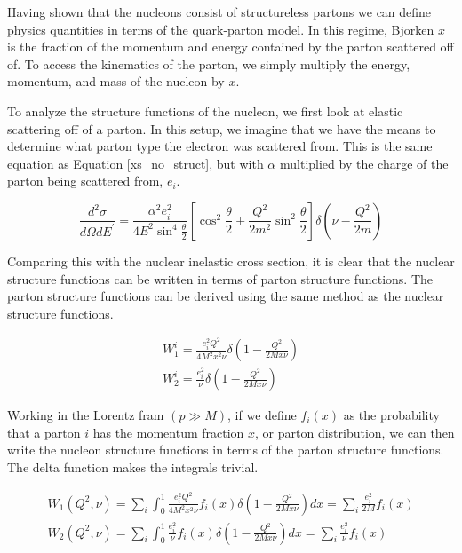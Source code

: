 
Having shown that the nucleons consist of structureless partons we can define physics quantities in terms of the quark-parton model. In this regime, Bjorken $x$ is the fraction of the momentum and energy contained by the parton scattered off of. To access the kinematics of the parton, we simply multiply the energy, momentum, and mass of the nucleon by $x$.

To analyze the structure functions of the nucleon, we first look at elastic scattering off of a parton. In this setup, we imagine that we have the means to determine what parton type the electron was scattered from. This is the same equation as Equation \ref{xs_no_struct}, but with $\alpha$ multiplied by the charge of the parton being scattered from, $e_i$.

\begin{equation}
	\frac{d^2\sigma}{d\Omega dE^\prime} = \frac{\alpha^{2}e_{i}^{2}}{4E^{2}\sin^{4}\frac{\theta}{2}} \left[\cos^{2}\frac{\theta}{2} + \frac{Q^2}{2m^2}\sin^{2}\frac{\theta}{2}\right] \delta\left(\nu-\frac{Q^2}{2m}\right)
\end{equation}

Comparing this with the nuclear inelastic cross section, it is clear that the nuclear structure functions can be written in terms of parton structure functions. The parton structure functions can be derived using the same method as the nuclear structure functions.

\begin{subequations}
\begin{align}
	W_1^i = \frac{e_{i}^{2}Q^2}{4M^{2}x^{2}\nu}\delta\left(1-\frac{Q^2}{2Mx\nu}\right) \\
	W_2^i = \frac{e_{i}^{2}}{\nu}\delta\left(1-\frac{Q^2}{2Mx\nu}\right)
\end{align}
\end{subequations}

Working in the Lorentz fram $\left(p \gg M\right)$, if we define $f_{i}\left(x\right)$ as the probability that a parton $i$ has the momentum fraction $x$, or parton distribution, we can then write the nucleon structure functions in terms of the parton structure functions. The delta function makes the integrals trivial.

\begin{subequations}
\begin{align}
	W_{1}\left(Q^{2},\nu\right) = \sum_{i}\int_0^1 \frac{e_{i}^{2}Q^2}{4M^{2}x^{2}\nu}f_{i}\left(x\right)\delta\left(1-\frac{Q^2}{2Mx\nu}\right) dx = \sum_{i} \frac{e_{i}^{2}}{2M}f_{i}\left(x\right) \\
	W_{2}\left(Q^{2},\nu\right) = \sum_{i}\int_0^1 \frac{e_{i}^{2}}{\nu}f_{i}\left(x\right)\delta\left(1-\frac{Q^2}{2Mx\nu}\right) dx = \sum_{i} \frac{e_{i}^{2}}{\nu}f_{i}\left(x\right)
\end{align}
\end{subequations}

